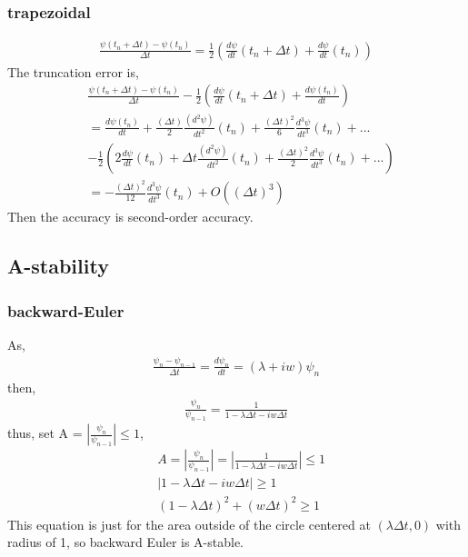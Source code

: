 \documentclass[12pt]{article}%
\begin{document}
\subsubsection{trapezoidal}
\begin{equation} \label{eq4}
\begin{split}
\frac{\psi(t_{n}+\Delta t) - \psi(t_{n})}{\Delta t}  = \frac{1}{2}(\frac{d\psi}{dt}(t_{n}+ \Delta t) + \frac{d\psi}{dt}(t_{n}) )
\end{split}
\end{equation}
The truncation error is,
\begin{equation} \label{eq5}
\begin{split}
&\frac{\psi(t_{n} + \Delta t) - \psi(t_{n})}{\Delta t} - \frac{1}{2}(\frac{d\psi}{dt}(t_{n} + \Delta t)+ \frac{d\psi(t_{n})}{dt})\\
& = \frac{d\psi(t_{n})}{dt} + \frac{(\Delta t)}{2}\frac{(d^{2}\psi)}{dt^{2}}(t_{n}) + \frac{(\Delta t)^{2}}{6}\frac{d^{3}\psi}{dt^{3}}(t_{n})  + ... \\
&- \frac{1}{2}(2\frac{d\psi}{dt}(t_{n}) + \Delta t\frac{(d^{2}\psi)}{dt^{2}}(t_{n}) + \frac{(\Delta t)^{2}}{2}\frac{d^{3}\psi}{dt^{3}}(t_{n})  + ...)\\
& = -\frac{(\Delta t)^{2}}{12}\frac{d^{3}\psi}{dt^{3}}(t_{n}) + O((\Delta t)^{3})
\end{split}
\end{equation}
Then the accuracy is second-order accuracy.
\subsection{A-stability}
\subsubsection{backward-Euler}
As, 
\begin{equation} \label{eq6}
\begin{split}
\frac{\psi_{n} - \psi_{n-1}}{\Delta t}  = \frac{d\psi_{n}}{dt} = (\lambda + iw)\psi_{n}
\end{split}
\end{equation}
then,
\begin{equation} \label{eq7}
\begin{split}
\frac{\psi_{n}}{\psi_{n-1}} = \frac{1}{1 - \lambda \Delta t - iw\Delta t} 
\end{split}
\end{equation}
thus,
set A = $|\frac{\psi_{n}}{\psi_{n-1}}| \leq 1$,
\begin{equation} \label{eq8}
\begin{split}
&A = |\frac{\psi_{n}}{\psi_{n-1}}| = |\frac{1}{1 - \lambda \Delta t - iw\Delta t} | \leq 1\\
& |1 - \lambda \Delta t - iw\Delta t| \geq 1 \\
&(1 - \lambda \Delta t)^{2} + (w\Delta t)^{2} \geq 1
\end{split}
\end{equation}
This equation is just for the area outside of the circle centered at $(\lambda \Delta t, 0)$ with radius of 1, so backward Euler is A-stable. 
\end{document}
